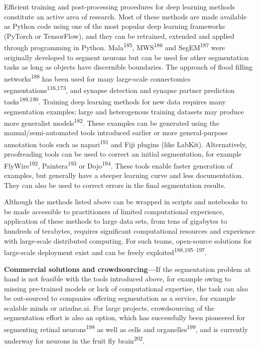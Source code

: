 \documentclass{article}
\begin{document}
Efficient training and post-processing procedures for deep learning methods constitute an active area of research. Most of these methods are made available as Python code using one of the most popular deep learning frameworks (PyTorch or TensorFlow), and they can be retrained, extended and applied through programming in Python. Mala\textsuperscript{185}, MWS\textsuperscript{186} and SegEM\textsuperscript{187} were originally developed to segment neurons but can be used for other segmentation tasks as long as objects have discernible boundaries. The approach of flood filling networks\textsuperscript{188} has been used for many large-scale connectomics segmentations\textsuperscript{116,173}, and synapse detection and synapse partner prediction tasks\textsuperscript{189,190}. Training deep learning methods for new data requires many segmentation examples; large and heterogenous training datasets may produce more generalist models\textsuperscript{182}. These examples can be generated using the manual/semi-automated tools introduced earlier or more general-purpose annotation tools such as napari\textsuperscript{191} and Fiji plugins (like LabKit). Alternatively, proofreading tools can be used to correct an initial segmentation, for example FlyWire\textsuperscript{192}, Paintera\textsuperscript{193} or Dojo\textsuperscript{194}. These tools enable faster generation of examples, but generally have a steeper learning curve and less documentation. They can also be used to correct errors in the final segmentation results.

Although the methods listed above can be wrapped in scripts and notebooks to be made accessible to practitioners of limited computational experience, application of these methods to large data sets, from tens of gigabytes to hundreds of terabytes, requires significant computational resources and experience with large-scale distributed computing. For such teams, open-source solutions for large-scale deployment exist and can be freely exploited\textsuperscript{188,195–197}.

\textbf{Commercial solutions and crowdsourcing—}If the segmentation problem at hand is not feasible with the tools introduced above, for example owing to missing pre-trained models or lack of computational expertise, the task can also be out-sourced to companies offering segmentation as a service, for example scalable minds or ariadne.ai. For large projects, crowdsourcing of the segmentation effort is also an option, which has successfully been pioneered for segmenting retinal neurons\textsuperscript{198} as well as cells and organelles\textsuperscript{199}, and is currently underway for neurons in the fruit fly brain\textsuperscript{202}.
\end{document}
